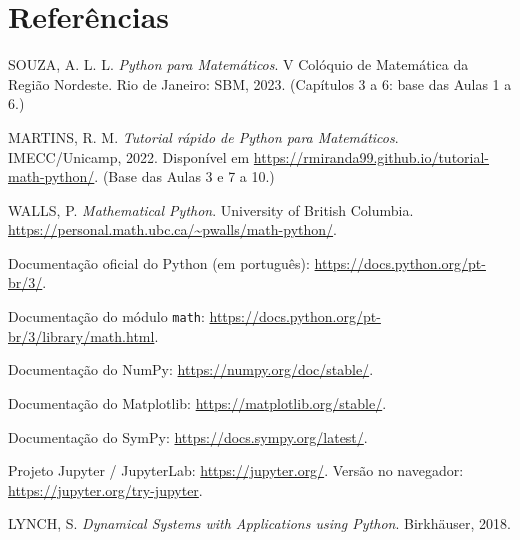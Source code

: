 \chapter*{Referências}

\begin{enumerate}[label={[\arabic*]}, leftmargin=*]
  \item SOUZA, A. L. L. \emph{Python para Matemáticos}. V Colóquio de Matemática da Região Nordeste.
        Rio de Janeiro: SBM, 2023. (Capítulos 3 a 6: base das Aulas 1 a 6.)
  \item MARTINS, R. M. \emph{Tutorial rápido de Python para Matemáticos}. IMECC/Unicamp, 2022.
        Disponível em \url{https://rmiranda99.github.io/tutorial-math-python/}. (Base das Aulas 3 e 7 a 10.)
  \item WALLS, P. \emph{Mathematical Python}. University of British Columbia.
        \url{https://personal.math.ubc.ca/~pwalls/math-python/}.
  \item Documentação oficial do Python (em português): \url{https://docs.python.org/pt-br/3/}.
  \item Documentação do módulo \texttt{math}: \url{https://docs.python.org/pt-br/3/library/math.html}.
  \item Documentação do NumPy: \url{https://numpy.org/doc/stable/}.
  \item Documentação do Matplotlib: \url{https://matplotlib.org/stable/}.
  \item Documentação do SymPy: \url{https://docs.sympy.org/latest/}.
  \item Projeto Jupyter / JupyterLab: \url{https://jupyter.org/}. Versão no navegador:
        \url{https://jupyter.org/try-jupyter}.
  \item LYNCH, S. \emph{Dynamical Systems with Applications using Python}. Birkhäuser, 2018.
\end{enumerate}
